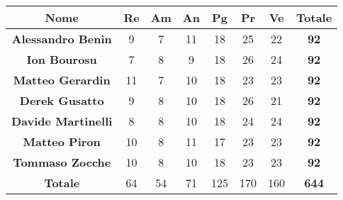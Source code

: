 \begin{table}[H]
    \centering
    \renewcommand{\arraystretch}{1.5}
    \begin{tabular}{|>{\bfseries}c|c|c|c|c|c|c|>{\bfseries}c|}
        \hline
        \rowcolor{gray!70} 
        \color{white}\textbf{Nome} & \color{white}\textbf{Re} & \color{white}\textbf{Am} & \color{white}\textbf{An} & \color{white}\textbf{Pg} & \color{white}\textbf{Pr} & \color{white}\textbf{Ve} & \color{white}\textbf{Totale} \\
        \hline
        \color{black}\textbf{Alessandro Benin} & 9 & 7 & 11 & 18 & 25 & 22 & 92 \\ 
        \hline
        \rowcolor{gray!10} %
        \color{black}\textbf{Ion Bourosu} & 7 & 8 & 9 & 18 & 26 & 24 & 92 \\ 
        \hline
        \color{black}\textbf{Matteo Gerardin} & 11 & 7 & 10 & 18 & 23 & 23 & 92 \\ 
        \hline
        \rowcolor{gray!10} %
        \color{black}\textbf{Derek Gusatto} & 9 & 8 & 10 & 18 & 26 & 21 & 92 \\ 
        \hline
         \color{black}\textbf{Davide Martinelli} & 8 & 8 & 10 & 18 & 24 & 24 & 92 \\ 
        \hline
        \rowcolor{gray!10} %
        \color{black}\textbf{Matteo Piron} & 10 & 8 & 11 & 17 & 23 & 23 & 92 \\ 
        \hline
        \color{black}\textbf{Tommaso Zocche} & 10 & 8 & 10 & 18 & 23 & 23 & 92 \\ 
        \hline
        \rowcolor{gray!70} 
        \color{white}\textbf{Totale} & \color{white}64 & \color{white}54 & \color{white}71 & \color{white}125 & \color{white}170 & \color{white}160 & \color{white}644 \\ 
        \hline
    \end{tabular}
    
\end{table}